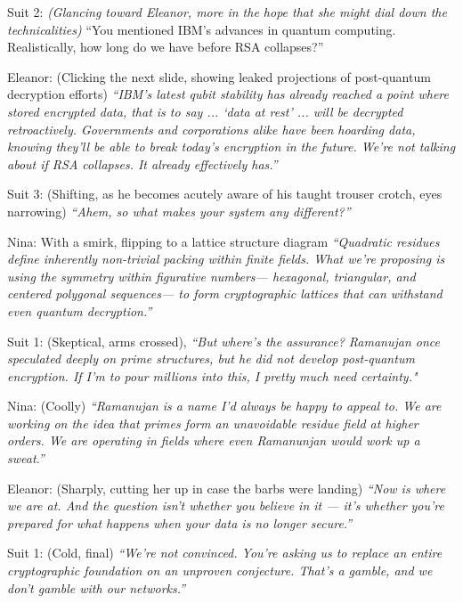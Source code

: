 Suit 2: \textit{(Glancing toward Eleanor, more in the hope that she might dial down the technicalities)} “You mentioned IBM’s advances in quantum computing. Realistically, how long do we have before RSA collapses?”

Eleanor: (Clicking the next slide, showing leaked projections of post-quantum decryption efforts) \textit{“IBM’s latest qubit stability has already reached a point where stored encrypted data, that is to say ... ‘data at rest’ ... will be decrypted retroactively. Governments and corporations alike have been \textit{hoarding} data, knowing they’ll be able to break today’s encryption in the future. We’re not talking about \textit{if} RSA collapses. It already effectively has.”}

\smallskip

Suit 3: (Shifting, as he becomes acutely aware of his taught trouser crotch, eyes narrowing) \textit{“Ahem, so what makes your system any different?”}

\smallskip

Nina: With a smirk, flipping to a lattice structure diagram \textit{“Quadratic residues define \textit{inherently non-trivial} packing within finite fields. What we’re proposing is using the symmetry within figurative numbers— hexagonal, triangular, and centered polygonal sequences— to form cryptographic lattices that can withstand even quantum decryption.”}

\smallskip

Suit 1: (Skeptical, arms crossed), \textit{“But where’s the \textit{assurance}? Ramanujan once speculated deeply on prime structures, but he did not develop post-quantum encryption. If I’m to pour millions into this, I pretty much need certainty."}

\smallskip

Nina: (Coolly) \textit{“Ramanujan is a name I’d always be happy to appeal to. We are working on the idea that primes form an unavoidable residue field at higher orders. We are operating in fields where even Ramanunjan would work up a sweat.”}

\smallskip

Eleanor: (Sharply, cutting her up in case the barbs were landing)\textit{ “Now is where we are at. And the question isn’t whether you believe in it — it’s whether you’re prepared for what happens when your data is no longer secure.”}

\smallskip

Suit 1: (Cold, final) \textit{“We’re not convinced. You’re asking us to replace an entire cryptographic foundation on an unproven conjecture. That’s a gamble, and we don’t gamble with our networks.”}

